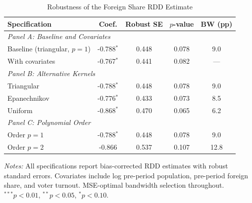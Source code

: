 \begin{table}[t]
\centering
\caption{Robustness of the Foreign Share RDD Estimate}
\label{tab:robustness}
\begin{tabular}{lcccc}
\hline\hline
Specification & Coef. & Robust SE & $p$-value & BW (pp) \\
\hline
\multicolumn{5}{l}{\textit{Panel A: Baseline and Covariates}} \\
[4pt]
Baseline (triangular, $p=1$) & -0.788$^{*}$ & 0.448 & 0.078 & 9.0 \\
With covariates & -0.767$^{*}$ & 0.441 & 0.082 & --- \\
[8pt]
\multicolumn{5}{l}{\textit{Panel B: Alternative Kernels}} \\
[4pt]
Triangular & -0.788$^{*}$ & 0.448 & 0.078 & 9.0 \\
Epanechnikov & -0.776$^{*}$ & 0.433 & 0.073 & 8.5 \\
Uniform & -0.868$^{*}$ & 0.470 & 0.065 & 6.2 \\
[8pt]
\multicolumn{5}{l}{\textit{Panel C: Polynomial Order}} \\
[4pt]
Order $p = 1$ & -0.788$^{*}$ & 0.448 & 0.078 & 9.0 \\
Order $p = 2$ & -0.866 & 0.537 & 0.107 & 12.8 \\
\hline\hline
\end{tabular}
\begin{tablenotes}[flushleft]
\small
\item \textit{Notes:} All specifications report bias-corrected RDD estimates with robust standard errors. Covariates include log pre-period population, pre-period foreign share, and voter turnout. MSE-optimal bandwidth selection throughout. $^{***}p<0.01$, $^{**}p<0.05$, $^{*}p<0.10$.
\end{tablenotes}
\end{table}

